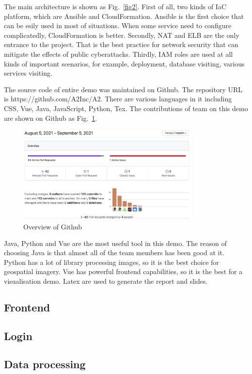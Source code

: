 \documentclass[conference]{IEEEtran}
\begin{document}
The main architecture is shown as Fig.~\ref{fig2}. First of all, two kinds of IaC platform, which are Ansible and CloudFormation.
Ansible is the first choice that can be esily used in most of situations. When some service need to configure complicatedly, CloudFormation is 
better. Secondly, NAT and ELB are the only entrance to the project. That is the best practice for network security that can mitigate the effects 
of public cyberattacks. Thirdly, IAM roles are used at all kinds of important scenarios, for example, deployment, database visiting, various services visiting.

The source code of entire demo was maintained on Github. The repository URL is https://github.com/A2Inc/A2. There are various languages in it including 
CSS, Vue, Java, JavaScript, Python, Tex. The contributions of team on this demo are shown on Github as Fig.~\ref{fig3}.

\begin{figure}[htbp]
    \centerline{\includegraphics[width=260pt]{images/github.png}}
    \caption{Overview of Github}
    \label{fig3}
\end{figure}

Java, Python and Vue are the most useful tool in this demo. The reason of choosing Java is that almost all of the team members has been good at it. Python 
has a lot of library processing images, so it is the best choice for geospatial imagery. Vue has powerful frontend capabilities, so it is the best for a 
visualisation demo. Latex are used to generate the report and slides.

\subsection{Frontend}

\subsection{Login}

\subsection{Data processing}
\end{document}
